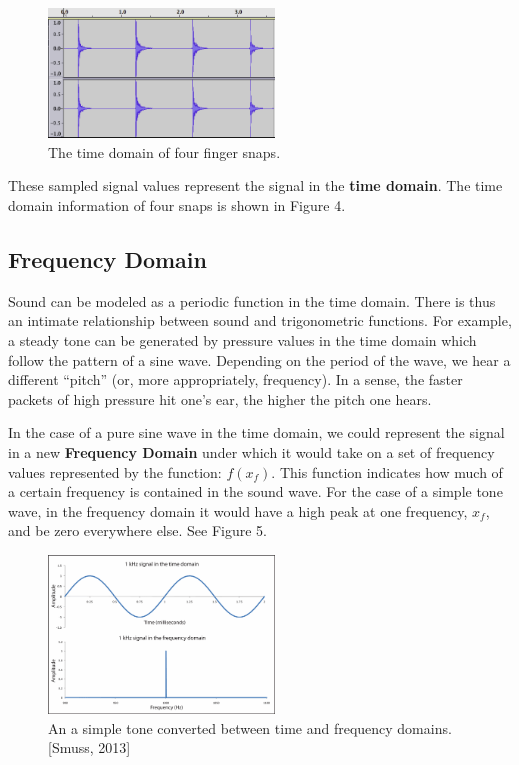 \documentclass[DIV=calc, paper=a4, fontsize=11pt, twocolumn]{scrartcl}   %
\begin{document}
\begin{figure}[h]
\centering
\includegraphics[width=60mm]{figures/snap_timedomain.png}
\caption{The time domain of four finger snaps.}
\label{overflow}
\end{figure}

These sampled signal values represent the signal in the \textbf{time domain}. The time domain information of four snaps is shown in Figure 4.
\subsection{Frequency Domain}
Sound can be modeled as a periodic function in the time domain. There is thus an intimate relationship between sound and trigonometric functions. For example, a steady tone can be generated by pressure values in the time domain which follow the pattern of a sine wave. Depending on the period of the wave, we hear a different ``pitch'' (or, more appropriately, frequency). In a sense, the faster packets of high pressure hit one's ear, the higher the pitch one hears.
\par  In the case of a pure sine wave in the time domain, we could represent the signal in a new \textbf{Frequency Domain} under which it would take on a set of frequency values represented by the function: $f(x_f)$. This function indicates how much of a certain frequency is contained in the sound wave. For the case of a simple tone wave, in the frequency domain it would have a high peak at one frequency, $x_f$, and be zero everywhere else. See Figure 5.

\begin{figure}[h]
\centering
\includegraphics[width=60mm]{figures/twodomains.png}
\caption{An a simple tone converted between time and frequency domains.[Smuss, 2013]}
\label{overflow}
\end{figure}
\end{document}
